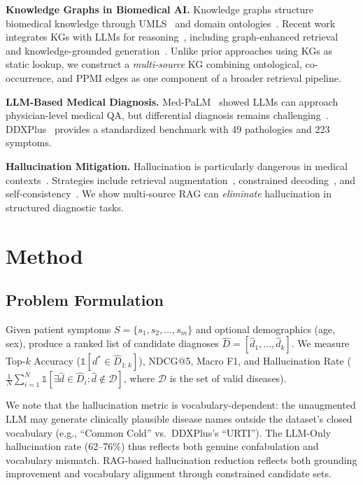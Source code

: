 \documentclass[runningheads]{llncs}
\begin{document}
\textbf{Knowledge Graphs in Biomedical AI.} Knowledge graphs structure biomedical knowledge through UMLS~\cite{bodenreider2004unified} and domain ontologies~\cite{santos2022knowledge,chandak2023building}. Recent work integrates KGs with LLMs for reasoning~\cite{pan2024unifying}, including graph-enhanced retrieval~\cite{he2024gretriever} and knowledge-grounded generation~\cite{yasunaga2022deep}. Unlike prior approaches using KGs as static lookup, we construct a \emph{multi-source} KG combining ontological, co-occurrence, and PPMI edges as one component of a broader retrieval pipeline.

\textbf{LLM-Based Medical Diagnosis.} Med-PaLM~\cite{singhal2023large} showed LLMs can approach physician-level medical QA, but differential diagnosis remains challenging~\cite{mcduff2023towards}. DDXPlus~\cite{fansi2022ddxplus} provides a standardized benchmark with 49 pathologies and 223 symptoms.

\textbf{Hallucination Mitigation.} Hallucination is particularly dangerous in medical contexts~\cite{ji2023survey,umapathi2023med}. Strategies include retrieval augmentation~\cite{shuster2021retrieval}, constrained decoding~\cite{lu2022neurologic}, and self-consistency~\cite{manakul2023selfcheckgpt}. We show multi-source RAG can \emph{eliminate} hallucination in structured diagnostic tasks.

\section{Method}
\label{sec:method}

\subsection{Problem Formulation}

Given patient symptoms $S = \{s_1, s_2, \ldots, s_m\}$ and optional demographics (age, sex), produce a ranked list of candidate diagnoses $\hat{D} = [\hat{d}_1, \ldots, \hat{d}_k]$. We measure Top-$k$ Accuracy ($\mathbb{1}[d^* \in \hat{D}_{1:k}]$), NDCG@5, Macro F1, and Hallucination Rate ($\frac{1}{N}\sum_{i=1}^{N} \mathbb{1}[\exists \hat{d} \in \hat{D}_i : \hat{d} \notin \mathcal{D}]$, where $\mathcal{D}$ is the set of valid diseases).

We note that the hallucination metric is vocabulary-dependent: the unaugmented LLM may generate clinically plausible disease names outside the dataset's closed vocabulary (e.g., ``Common Cold'' vs.\ DDXPlus's ``URTI''). The LLM-Only hallucination rate (62--76\%) thus reflects both genuine confabulation and vocabulary mismatch. RAG-based hallucination reduction reflects both grounding improvement and vocabulary alignment through constrained candidate sets.
\end{document}
